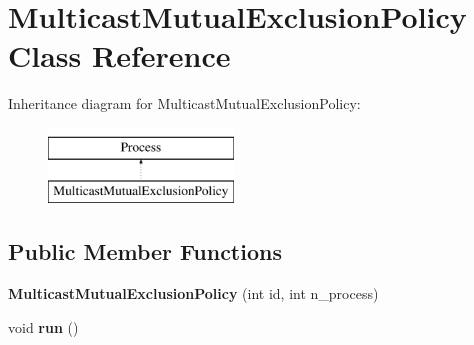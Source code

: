 \hypertarget{classdistributed__system_1_1MulticastMutualExclusionPolicy}{}\section{Multicast\+Mutual\+Exclusion\+Policy Class Reference}
\label{classdistributed__system_1_1MulticastMutualExclusionPolicy}
Inheritance diagram for Multicast\+Mutual\+Exclusion\+Policy\+:\begin{figure}[H]
\begin{center}
\leavevmode
\includegraphics[height=2.000000cm]{classdistributed__system_1_1MulticastMutualExclusionPolicy}
\end{center}
\end{figure}
\subsection*{Public Member Functions}
\begin{DoxyCompactItemize}
\item 
{\bfseries Multicast\+Mutual\+Exclusion\+Policy} (int id, int n\+\_\+process)\hypertarget{classdistributed__system_1_1MulticastMutualExclusionPolicy_aec982e06c8b0794c5c65301c59db568f}{}\label{classdistributed__system_1_1MulticastMutualExclusionPolicy_aec982e06c8b0794c5c65301c59db568f}

\item 
void {\bfseries run} ()\hypertarget{classdistributed__system_1_1MulticastMutualExclusionPolicy_a13a43e6d814de94978c515cb084873b1}{}\label{classdistributed__system_1_1MulticastMutualExclusionPolicy_a13a43e6d814de94978c515cb084873b1}

\end{DoxyCompactItemize}
